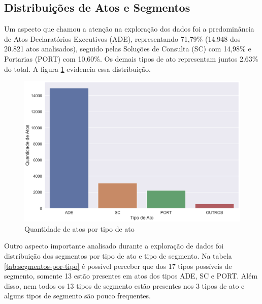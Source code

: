 \subsection{Distribuições de Atos e Segmentos}

Um aspecto que chamou a atenção na exploração dos dados foi a predominância de Atos Declaratórios Executivos (ADE), representando 71,79\% (14.948 dos 20.821 atos analisados), seguido pelas Soluções de Consulta (SC) com 14,98\% e Portarias (PORT) com 10,60\%. Os demais tipos de ato representam juntos 2.63\% do total. A figura \ref{fig:atos-por-tipo-ato} evidencia essa distribuição.

\begin{figure}[h]
	\caption{Quantidade de atos por tipo de ato}
	\center
	\label{fig:atos-por-tipo-ato}
	\includegraphics[scale=1.9]{exploratoria/atos-por-tipo-ato.png}
	\fdp
\end{figure}

Outro aspecto importante analisado durante a exploração de dados foi distribuição dos segmentos por tipo de ato e tipo de segmento. Na tabela \ref{tab:segmentos-por-tipo} é possível perceber que dos 17 tipos possíveis de segmento, somente 13 estão presentes em atos dos tipos ADE, SC e PORT. Além disso, nem todos os 13 tipos de segmento estão presentes nos 3 tipos de ato e alguns tipos de segmento são pouco frequentes.

